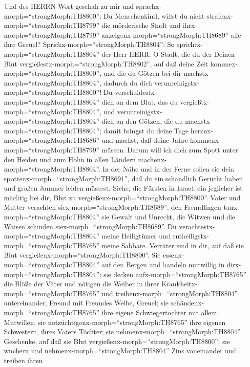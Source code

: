  Und des HERRN Wort geschah zu mir und
sprachx-morph=``strongMorph:TH8800'':  Du Menschenkind,
willst du nicht strafenx-morph=``strongMorph:TH8799'' die mörderische
Stadt und ihrx-morph=``strongMorph:TH8799''
anzeigenx-morph=``strongMorph:TH8689'' alle ihre Greuel? 
Sprichx-morph=``strongMorph:TH8804'': So
sprichtx-morph=``strongMorph:TH8804'' der Herr HERR: O Stadt, die du der
Deinen Blut vergießestx-morph=``strongMorph:TH8802'', auf daß deine Zeit
kommex-morph=``strongMorph:TH8800'', und die du Götzen bei dir
machstx-morph=``strongMorph:TH8804'', dadurch du dich
verunreinigstx-morph=``strongMorph:TH8800''!  Du
verschuldestx-morph=``strongMorph:TH8804'' dich an dem Blut, das du
vergießtx-morph=``strongMorph:TH8804'', und
verunreinigstx-morph=``strongMorph:TH8804'' dich an den Götzen, die du
machstx-morph=``strongMorph:TH8804''; damit bringst du deine Tage
herzux-morph=``strongMorph:TH8686'' und machst, daß deine Jahre
kommenx-morph=``strongMorph:TH8799'' müssen. Darum will ich dich zum
Spott unter den Heiden und zum Hohn in allen Ländern
machenx-morph=``strongMorph:TH8804''.  In der Nähe und in
der Ferne sollen sie dein spottenx-morph=``strongMorph:TH8691'', daß du
ein schändlich Gerücht haben und großen Jammer leiden müssest.
 Siehe, die Fürsten in Israel, ein jeglicher ist mächtig bei
dir, Blut zu vergießenx-morph=``strongMorph:TH8800''.  Vater
und Mutter verachten siex-morph=``strongMorph:TH8689'', den Fremdlingen
tunx-morph=``strongMorph:TH8804'' sie Gewalt und Unrecht, die Witwen und
die Waisen schinden siex-morph=``strongMorph:TH8689''.  Du
verachtestx-morph=``strongMorph:TH8804'' meine Heiligtümer und
entheiligstx-morph=``strongMorph:TH8765'' meine Sabbate. 
Verräter sind in dir, auf daß sie Blut
vergießenx-morph=``strongMorph:TH8800''. Sie
essenx-morph=``strongMorph:TH8804'' auf den Bergen und handeln mutwillig
in dirx-morph=``strongMorph:TH8804'';  sie decken
aufx-morph=``strongMorph:TH8765'' die Blöße der Väter und nötigen die
Weiber in ihrer Krankheitx-morph=``strongMorph:TH8765'' 
und treibenx-morph=``strongMorph:TH8804'' untereinander, Freund mit
Freundes Weibe, Greuel; sie schändenx-morph=``strongMorph:TH8765'' ihre
eigene Schwiegertochter mit allem Mutwillen; sie
notzüchtigenx-morph=``strongMorph:TH8765'' ihre eigenen Schwestern,
ihres Vaters Töchter;  sie
nehmenx-morph=``strongMorph:TH8804'' Geschenke, auf daß sie Blut
vergießenx-morph=``strongMorph:TH8800''; sie wuchern und
nehmenx-morph=``strongMorph:TH8804'' Zins voneinander und treiben ihren
